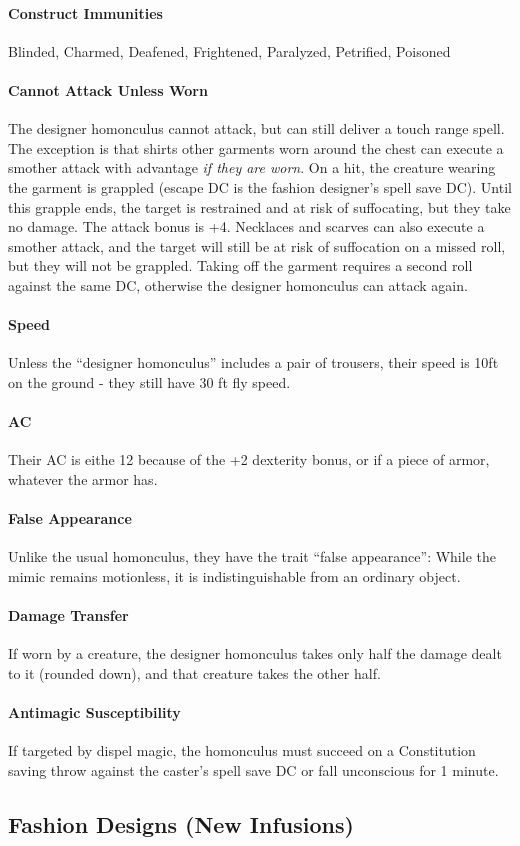 \documentclass[twocolumn]{dndbook}
\begin{document}
\paragraph{Construct Immunities} Blinded, Charmed, Deafened, Frightened, Paralyzed, Petrified, Poisoned

\paragraph{Cannot Attack Unless Worn}
The designer homonculus cannot attack, but can still deliver a touch range spell.
The exception is that shirts other garments worn around the chest can execute a smother attack with advantage \emph{if they are worn}.
On a hit, the creature wearing the garment is grappled (escape DC is the fashion designer's spell save DC).
Until this grapple ends, the target is restrained and at risk of suffocating, but they take no damage.
The attack bonus is +4.
Necklaces and scarves can also execute a smother attack, and the target will still be at risk of suffocation on a missed roll, but they will not be grappled.
Taking off the garment requires a second roll against the same DC, otherwise the designer homonculus can attack again.

\paragraph{Speed}
Unless the ``designer homonculus'' includes a pair of trousers, their speed is 10ft on the ground - they still have 30 ft fly speed.

\paragraph{AC}
Their AC is eithe 12 because of the +2 dexterity bonus, or if a piece of armor, whatever the armor has.

\paragraph{False Appearance}
Unlike the usual homonculus, they have the trait ``false appearance'':
While the mimic remains motionless, it is indistinguishable from an ordinary object.

\paragraph{Damage Transfer}
If worn by a creature, the designer homonculus takes only half the damage dealt to it (rounded down), and that creature takes the other half.

\paragraph{Antimagic Susceptibility}
If targeted by dispel magic, the homonculus must succeed on a Constitution saving throw against the caster's spell save DC or fall unconscious for 1 minute.


\subsection{Fashion Designs (New Infusions)}
\end{document}
